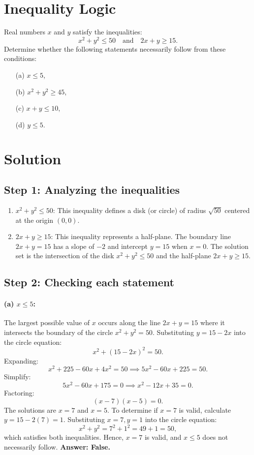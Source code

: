 \documentclass[12pt]{article}
\begin{document}
\section*{Inequality Logic}
Real numbers \(x\) and \(y\) satisfy the inequalities:
\[
x^2 + y^2 \leq 50 \quad \text{and} \quad 2x + y \geq 15.
\]
Determine whether the following statements necessarily follow from these conditions:
\begin{enumerate}
    \item[(a)] \(x \leq 5\),
    \item[(b)] \(x^2 + y^2 \geq 45\),
    \item[(c)] \(x + y \leq 10\),
    \item[(d)] \(y \leq 5\).
\end{enumerate}

\section*{Solution}

\subsection*{Step 1: Analyzing the inequalities}
\begin{enumerate}
    \item \(x^2 + y^2 \leq 50\): This inequality defines a disk (or circle) of radius \(\sqrt{50}\) centered at the origin \((0, 0)\).
    \item \(2x + y \geq 15\): This inequality represents a half-plane. The boundary line \(2x + y = 15\) has a slope of \(-2\) and intercept \(y = 15\) when \(x = 0\). The solution set is the intersection of the disk \(x^2 + y^2 \leq 50\) and the half-plane \(2x + y \geq 15\).
\end{enumerate}

\subsection*{Step 2: Checking each statement}

\paragraph{(a) \(x \leq 5\):}

The largest possible value of \(x\) occurs along the line \(2x + y = 15\) where it intersects the boundary of the circle \(x^2 + y^2 = 50\). Substituting \(y = 15 - 2x\) into the circle equation:
\[
x^2 + (15 - 2x)^2 = 50.
\]
Expanding:
\[
x^2 + 225 - 60x + 4x^2 = 50 \implies 5x^2 - 60x + 225 = 50.
\]
Simplify:
\[
5x^2 - 60x + 175 = 0 \implies x^2 - 12x + 35 = 0.
\]
Factoring:
\[
(x - 7)(x - 5) = 0.
\]
The solutions are \(x = 7\) and \(x = 5\). To determine if \(x = 7\) is valid, calculate \(y = 15 - 2(7) = 1\). Substituting \(x = 7, y = 1\) into the circle equation:
\[
x^2 + y^2 = 7^2 + 1^2 = 49 + 1 = 50,
\]
which satisfies both inequalities. Hence, \(x = 7\) is valid, and \(x \leq 5\) does not necessarily follow. \textbf{Answer: False.}
\end{document}
